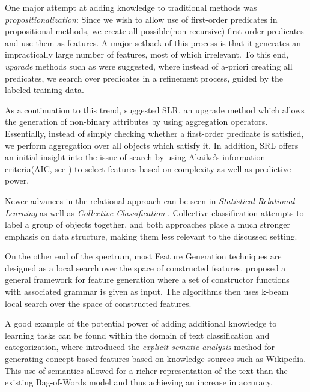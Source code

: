 \documentclass[letterpaper]{article}
\theoremstyle{definition}
\begin{document}
One major attempt at adding knowledge to traditional methods was \emph{propositionalization}\cite{kramer2000bottom}: Since we wish to allow use of first-order predicates in propositional methods, we create all possible(non recursive) first-order predicates and use them as features.
A major setback of this process is that it generates an impractically large number of features, most of which irrelevant.  To this end, \emph{upgrade} methods such as \cite{van2001upgrade} were suggested, where instead of a-priori creating all predicates, we search over predicates in a refinement process, guided by the labeled training data.

As a continuation to this trend, \cite{popescul2003statistical} suggested SLR, an upgrade method which allows the generation of non-binary attributes by using aggregation operators. Essentially, instead of simply checking whether a first-order predicate is satisfied, we perform aggregation over all objects which satisfy it. In addition, SRL offers an initial insight into the issue of search by using Akaike's information criteria(AIC, see \cite{burnham2002model}) to select features based on complexity as well as predictive power.

Newer advances in the relational approach can be seen in \emph{Statistical Relational Learning} \cite{blockeel2013statistical,nath2014learning} as well as \emph{Collective Classification} \cite{kajdanowicz2013collective,laorden2012collective}. Collective classification attempts to label a group of objects together, and both approaches place a much stronger emphasis on data structure, making them less relevant to the discussed setting.


On the other end of the spectrum, most Feature Generation techniques are designed as a local search over the space of constructed features.
\cite{markovitch2002feature} proposed a general framework for feature generation where a set of constructor functions  with associated grammar is given as input.  The algorithms then uses k-beam local search over the space of constructed features.

A good example of the potential power of adding additional knowledge to learning tasks can be found within the domain of text classification and categorization, where \cite{gabrilovich2007computing}
introduced the \emph{explicit sematic analysis} method for generating concept-based features based on knowledge sources such as Wikipedia.
This use of semantics allowed for a richer representation of the text than the existing Bag-of-Words model and thus achieving an increase in accuracy.
\end{document}
